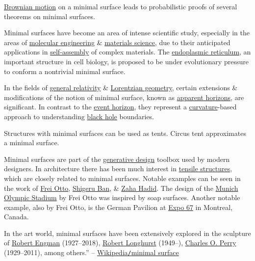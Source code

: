 \documentclass{article}
\begin{document}
\href{https://en.wikipedia.org/wiki/Wiener_process}{Brownian motion} on a minimal surface leads to probabilistic proofs of several theorems on minimal surfaces.

Minimal surfaces have become an area of intense scientific study, especially in the areas of \href{https://en.wikipedia.org/wiki/Molecular_engineering}{molecular engineering} \& \href{https://en.wikipedia.org/wiki/Materials_science}{materials science}, due to their anticipated applications in \href{https://en.wikipedia.org/wiki/Self-assembly}{self-assembly} of complex materials. The \href{https://en.wikipedia.org/wiki/Endoplasmic_reticulum}{endoplasmic reticulum}, an important structure in cell biology, is proposed to be under evolutionary pressure to conform a nontrivial minimal surface.

In the fields of \href{https://en.wikipedia.org/wiki/General_relativity}{general relativity} \& \href{https://en.wikipedia.org/wiki/Lorentzian_manifold}{Lorentzian geometry}, certain extensions \& modifications of the notion of minimal surface, known as \href{https://en.wikipedia.org/wiki/Apparent_horizon}{apparent horizons}, are significant. In contrast to the \href{https://en.wikipedia.org/wiki/Event_horizon}{event horizon}, they represent a \href{https://en.wikipedia.org/wiki/Curvature}{curvature}-based approach to understanding \href{https://en.wikipedia.org/wiki/Black_hole}{black hole} boundaries.

Structures with minimal surfaces can be used as tents. {\sf Circus tent approximates a minimal surface.}

Minimal surfaces are part of the \href{https://en.wikipedia.org/wiki/Generative_Design}{generative design} toolbox used by modern designers. In architecture there has been much interest in \href{https://en.wikipedia.org/wiki/Tensile_structure}{tensile structures}, which are closely related to minimal surfaces. Notable examples can be seen in the work of \href{https://en.wikipedia.org/wiki/Frei_Otto}{\sc Frei Otto}, \href{https://en.wikipedia.org/wiki/Shigeru_Ban}{\sc Shigeru Ban}, \& \href{https://en.wikipedia.org/wiki/Zaha_Hadid}{Zaha Hadid}. The design of the \href{https://en.wikipedia.org/wiki/Olympiastadion_(Munich)}{Munich Olympic Stadium} by {\sc Frei Otto} was inspired by soap surfaces. Another notable example, also by {\sc Frei Otto}, is the German Pavilion at \href{https://en.wikipedia.org/wiki/Expo_67_pavilions}{Expo 67} in Montreal, Canada.

In the art world, minimal surfaces have been extensively explored in the sculpture of \href{https://en.wikipedia.org/wiki/Robert_Engman}{\sc Robert Engman} (1927--2018), \href{https://en.wikipedia.org/wiki/Robert_Longhurst}{\sc Robert Longhurst} (1949--), \href{https://en.wikipedia.org/wiki/Charles_O._Perry}{\sc Charles O. Perry} (1929--2011), among others.'' -- \href{https://en.wikipedia.org/wiki/Minimal_surface}{Wikipedia{\tt/}minimal surface}
\end{document}

